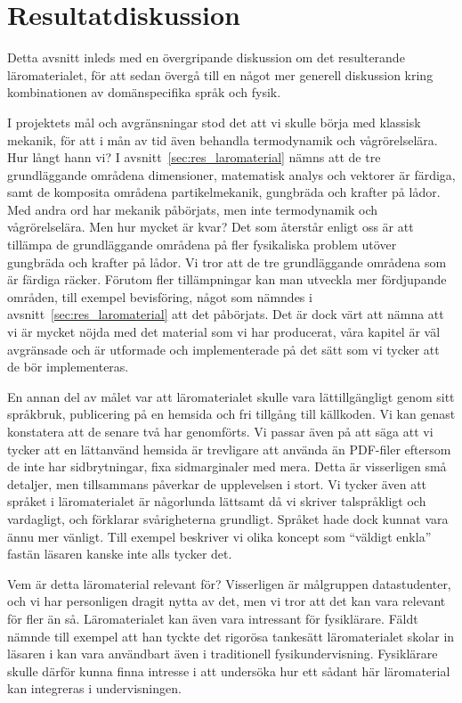 \section{Resultatdiskussion}\label{sec:res_disk}

Detta avsnitt inleds med en övergripande diskussion om det resulterande
läromaterialet, för att sedan övergå till en något mer generell diskussion kring
kombinationen av domänspecifika språk och fysik.

I projektets mål och avgränsningar stod det att vi skulle börja med klassisk
mekanik, för att i mån av tid även behandla termodynamik och vågrörelselära. Hur långt
hann vi? I avsnitt~\ref{sec:res_laromaterial} nämns att de tre grundläggande
områdena dimensioner, matematisk analys och vektorer är färdiga, samt de
komposita områdena partikelmekanik, gungbräda och krafter på lådor. Med andra
ord har mekanik påbörjats, men inte termodynamik och vågrörelselära. Men hur mycket är
kvar? Det som återstår enligt oss är att tillämpa de grundläggande områdena på
fler fysikaliska problem utöver gungbräda och krafter på lådor. Vi tror att de
tre grundläggande områdena som är färdiga räcker. Förutom fler tillämpningar kan
man utveckla mer fördjupande områden, till exempel bevisföring, något som
nämndes i avsnitt~\ref{sec:res_laromaterial} att det påbörjats. Det är dock värt
att nämna att vi är mycket nöjda med det material som vi har producerat, våra
kapitel är väl avgränsade och är utformade och implementerade på det sätt som vi
tycker att de bör implementeras. 

En annan del av målet var att läromaterialet skulle vara lättillgängligt genom
sitt språkbruk, publicering på en hemsida och fri tillgång till källkoden.
Vi kan genast konstatera att de senare två har genomförts. Vi passar även på att
säga att vi tycker att en lättanvänd hemsida är trevligare att använda än
PDF-filer eftersom de inte har sidbrytningar, fixa sidmarginaler med mera. Detta
är visserligen små detaljer, men tillsammans påverkar de upplevelsen i stort. Vi
tycker även att språket i läromaterialet är någorlunda lättsamt då vi skriver
talspråkligt och vardagligt, och förklarar svårigheterna grundligt. Språket hade
dock kunnat vara ännu mer vänligt. Till exempel beskriver vi olika koncept som
``väldigt enkla'' fastän läsaren kanske inte alls tycker det.

Vem är detta läromaterial relevant för? Visserligen är målgruppen datastudenter, och vi har personligen dragit nytta av det,
men vi tror att det kan vara relevant för fler än så. Läromaterialet
kan även vara intressant för fysiklärare. Fäldt nämnde till exempel att han
tyckte det rigorösa tankesätt läromaterialet skolar in läsaren i kan vara
användbart även i traditionell fysikundervisning. Fysiklärare skulle därför
kunna finna intresse i att undersöka hur ett sådant här läromaterial kan
integreras i undervisningen.


